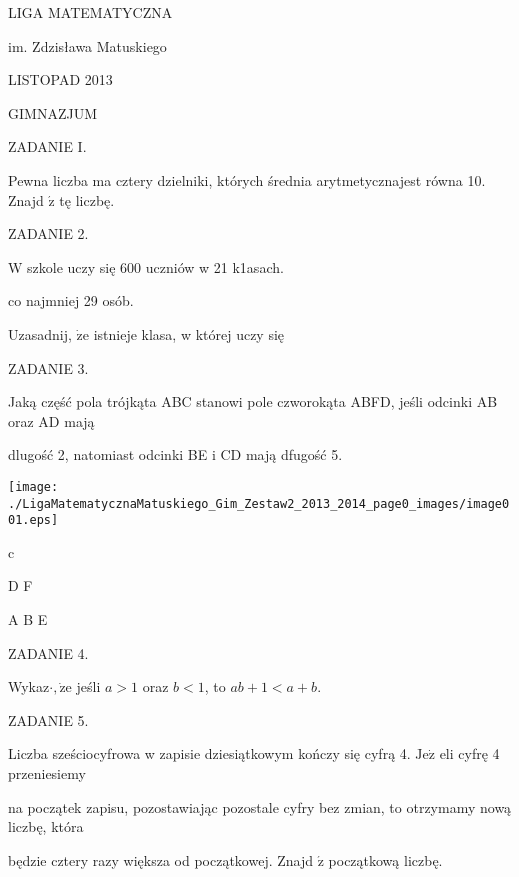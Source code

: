\documentclass[a4paper,12pt]{article}
\begin{document}
LIGA MATEMATYCZNA

im. Zdzisława Matuskiego

LISTOPAD 2013

GIMNAZJUM

ZADANIE I.

Pewna liczba ma cztery dzielniki, których średnia arytmetycznajest równa 10. Znajd $\acute{\mathrm{z}}$ tę liczbę.

ZADANIE 2.

W szkole uczy się 600 uczniów w 21 k1asach.

co najmniej 29 osób.

Uzasadnij, $\dot{\mathrm{z}}\mathrm{e}$ istnieje klasa, w której uczy się

ZADANIE 3.

Jaką część pola trójkąta ABC stanowi pole czworokąta ABFD, jeśli odcinki AB oraz AD mają

dlugość 2, natomiast odcinki BE i CD mają dfugość 5.
\begin{center}
\texttt{[image: ./LigaMatematycznaMatuskiego\_Gim\_Zestaw2\_2013\_2014\_page0\_images/image001.eps]}
\end{center}
c

D F

A  B  E

ZADANIE 4.

Wykaz$\cdot, \dot{\mathrm{z}}\mathrm{e}$ jeśli $a>1$ oraz $b<1$, to $ab+1<a+b.$

ZADANIE 5.

Liczba sześciocyfrowa w zapisie dziesiątkowym kończy się cyfrą 4. $\mathrm{J}\mathrm{e}\dot{\mathrm{z}}$ eli cyfrę 4 przeniesiemy

na początek zapisu, pozostawiając pozostale cyfry bez zmian, to otrzymamy nową liczbę, która

będzie cztery razy większa od początkowej. Znajd $\acute{\mathrm{z}}$ początkową liczbę.
\end{document}
